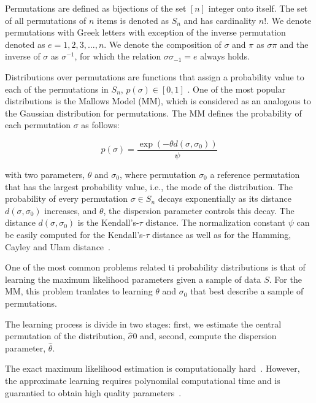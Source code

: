 \documentclass[runningheads]{llncs}
\begin{document}
Permutations are defined as bijections of the set $[n]$ integer onto itself. The set of all permutations of $n$ items is denoted as $S_n$ and has cardinality $n!$. We denote permutations with Greek letters with exception of the inverse permutation denoted as $e=1, 2, 3, \ldots,n$. We denote the composition of $\sigma$ and $\pi$ as $\sigma\pi$ and the inverse of $\sigma$ as $\sigma^{-1}$, for which the relation $\sigma\sigma_{-1}=e$ always holds. 

Distributions over permutations are functions that assign a probability value to each of the permutations in $S_n$, $p(\sigma)\in[0,1]$ \cite{critchlow91}. One of the most popular distributions is the Mallows Model (MM), which is considered as an analogous to the Gaussian distribution for permutations. The MM defines the probability of each permutation $\sigma$ as follows:

\begin{equation}
p(\sigma)=\frac{\exp(-\theta d(\sigma, \sigma_0))}{\psi}
\end{equation}

with two parameters, $\theta$ and $\sigma_0$, 
where permutation $\sigma_0$ a reference permutation that has the largest probability value, i.e., the mode of the distribution. The probability of every permutation $\sigma\in S_n$ decays exponentially as its distance $d(\sigma,\sigma_0)$ increases, and $\theta$, the dispersion parameter controls this decay. The distance $d(\sigma,\sigma_0)$ is the Kendall's-$\tau$ distance. The normalization constant $\psi$ can be easily computed for the Kendall's-$\tau$ distance as well as for the Hamming, Cayley and Ulam distance~\cite{Irurozki2016b}. 

One of the most common problems related ti probability distributions is that of learning the maximum likelihood parameters  given a sample of data $S$. For the MM, this problem tranlates to learning $\theta$ and $\sigma_0$ that best describe a sample of permutations. 

The learning process is divide in two stages: first, we estimate the central permutation of the distribution, $\hat\sigma0$ and, second, compute the dispersion parameter, $\hat\theta$. 

The exact maximum likelihood estimation is computationally hard~\cite{Dwork:2001:RAM:371920.372165}. However, the approximate learning requires polynomilal computational time and is guarantied to obtain high quality parameters~\cite{Caragiannis2013,Coppersmith:2010}. 
\end{document}

